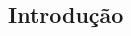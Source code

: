 \documentclass[a0,portrait]{a0poster}
\newtheorem{theorem}{Teorema}
\newtheorem{lemma}[theorem]{Lema}
\begin{document}
\begin{minipage}[c]{\linewidth}
\begin{framed}
\begin{multicols}{2}
\section*{Introdução}


\end{multicols}
\end{framed}
\end{minipage}
\end{document}
